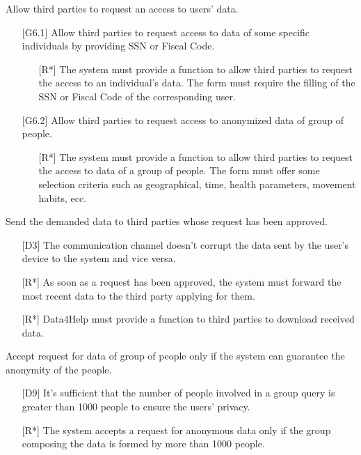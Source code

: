 \begin{enumerate} [label={[G\arabic*]}]
    \item Allow third parties to request an access to users' data.
    \begin{enumerate} [label*={.\arabic*}]
        \item [{[G6.1]}] Allow third parties to request access to data of some specific individuals by providing SSN or Fiscal Code.
            \begin{itemize}
                \item [{[R*]}] The system must provide a function to allow third parties to request the access to an individual's data. The form must require the filling of the SSN or Fiscal Code of the corresponding user.
            \end{itemize}
        \item [{[G6.2]}] Allow third parties to request access to anonymized data of group of people.
            \begin{itemize}
                \item [{[R*]}] The system must provide a function to allow third parties to request the access to data of a group of people. The form must offer some selection criteria such as geographical, time, health parameters, movement habits, ecc.
            \end{itemize}
    \end{enumerate}
    
    \item Send the demanded data to third parties whose request has been approved.
        \begin{itemize}
            \item [{[D3]}] The communication channel doesn't corrupt the data sent by the user's device to the system and vice versa.
            \item [{[R*]}] As soon as a request has been approved, the system must forward the most recent data to the third party applying for them.
            \item [{[R*]}] Data4Help must provide a function to third parties to download received data.
        \end{itemize}
        
        
    \item Accept request for data of group of people only if the system can guarantee the anonymity of the people.
        \begin{itemize}
            \item [{[D9]}] It’s sufficient that the number of people involved in a group query is greater than 1000 people to ensure the users’ privacy.
            \item [{[R*]}] The system accepts a request for anonymous data only if the group composing the data is formed by more than 1000 people.
        \end{itemize}
        

\end{enumerate}
